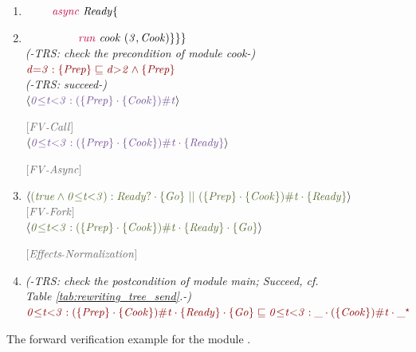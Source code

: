 \documentclass[acmsmall,10pt,review]{acmart}
\newcommand{\key}[1]{\textcolor{purple}{\code{#1}}}
\newcommand{\siderule}[1]{
\code{\footnotesize{\textcolor{mGray}{#1}}}}
\newcommand{\code}[1]{{\tt{\ensuremath{\m{#1}}}}}
\newcommand{\CONTAIN}{\sqsubseteq}
\newcommand{\m}{\mathit}
\newcommand\tabref[1]{Table \textcolor{black}{\ref{#1}}.}
\begin{document}
{\begin{figure}[ht]
\begin{minipage}[c]{\columnwidth}
{\begin{enumerate}
  \item    \code{~\qquad \key{async}\ Ready\{}
  \item      \code{~\qquad \ \qquad \key{run}\ cook\ (3, Cook) 
     \}\}\}}
      \\
                     \textcolor{mGray}{\emph{(-TRS: check the  precondition of module cook-) }} \\
              \code{  \textcolor{darkred}{d{=}3 : \{Prep\}  \CONTAIN  d{>}2 \wedge \{Prep\}} }   \\
             
               \textcolor{mGray}{\emph{(-TRS: succeed-) }}
      \\
     \code{\langle  \textcolor{darklavender}{ 0{\leq}t {<}3 : (\{Prep\}\cdot \{Cook\})\# t}  \rangle } 
     \siderule{ [FV\text{-}Call]}
      \\
     \code{\langle  \textcolor{darklavender}{ 0{\leq}t {<}3 : (\{Prep\}\cdot \{Cook\})\# t \cdot \{ Ready\}}  \rangle } 
     \siderule{ [FV\text{-}Async]}
     \\ \item
                   \code{\langle \textcolor{huntergreen}{(true \wedge 0{\leq}t {<}3) :  Ready? \cdot\{Go\}  \ || \  (\{Prep\}\cdot \{Cook\})\# t \cdot \{ Ready\}} \rangle }   \siderule{ [FV\text{-}Fork]} 
        \\ 
         \code{\langle \textcolor{huntergreen}{0{\leq}t {<}3 : (\{Prep\}\cdot \{Cook\})\# t \cdot \{ Ready\} \cdot \{Go\}} \rangle }
         \siderule{ [Effects\text{-}Normalization]} 
         \\
              \item 
               \textcolor{mGray}{  \emph{(-TRS: check the  postcondition of module main; Succeed, cf. \tabref{tab:rewriting_tree_send}-) }}\\
                  \code{  \textcolor{darkred}{
{0 {\leq} t {<}3} : (\{Prep\}\cdot \{Cook\})\# t \cdot \{ Ready\} \cdot \{Go\}
 \CONTAIN {0 {\leq} t  {<}3} : \_\cdot (\{Cook\})\# t \cdot\_^\star} 
                  }    \\
     
\end{enumerate}}

     \end{minipage}
      \vspace{0mm}
      \caption{The forward verification example for the module {}. }\label{fig:forward_example}
      \vspace{-1mm}
\end{figure}
}
\end{document}
